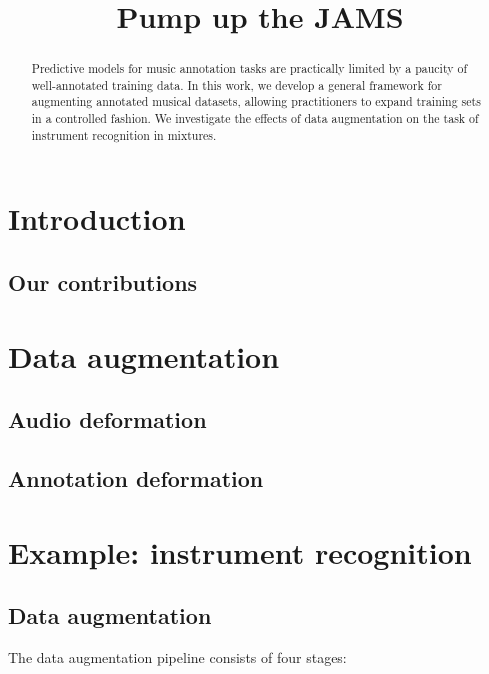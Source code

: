 \documentclass{article}
\title{Pump up the JAMS}
\begin{document}
%
\maketitle
%
\begin{abstract}
Predictive models for music annotation tasks are practically limited by a paucity of
well-annotated training data.
In this work, we develop a general framework for augmenting annotated musical datasets,
allowing practitioners to expand training sets in a controlled fashion.
We investigate the effects of data augmentation on the task of instrument recognition in
mixtures.
\end{abstract}
%
\section{Introduction}
\label{sec:introduction}

\cite{sturmkiki}

\subsection{Our contributions}

\section{Data augmentation}

\cite{mauch2013audio}

\subsection{Audio deformation}

\subsection{Annotation deformation}

\cite{humphreyjams}

\section{Example: instrument recognition}

\cite{bittner2014medleydb}

\subsection{Data augmentation}

The data augmentation pipeline consists of four stages:
\end{document}
